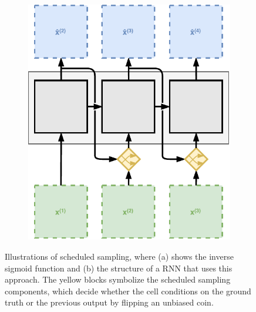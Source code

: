 \begin{figure}[htpb]
\centering
\begin{subfigure}{0.5\textwidth}
  \centering
  \caption{}
  \label{fig:sched-sample-inv-sig}
\end{subfigure}%
\begin{subfigure}{0.5\textwidth}
  \centering
  \includegraphics[width=.8\linewidth]{figures/sched_sample.pdf}
  \caption{}
  \label{fig:sched-sample-process}
\end{subfigure}
\caption[Scheduled Sampling]{Illustrations of scheduled sampling, where (a) shows the inverse sigmoid function and (b) the structure of a RNN that uses this approach. The yellow blocks symbolize the scheduled sampling components, which decide whether the cell conditions on the ground truth or the previous output by flipping an unbiased coin.} \label{fig:sched-sample}
\end{figure}




